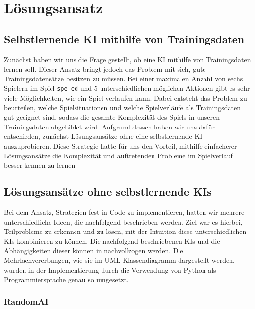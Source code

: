 \chapter{Lösungsansatz}
\label{ch:loesungsansatz}

\section{Selbstlernende KI mithilfe von Trainingsdaten}
\label{sec:selbstlernende-ki-trainingsdaten}

Zunächst haben wir uns die Frage gestellt, ob eine \ac{KI} mithilfe von Trainingsdaten lernen soll.
Dieser Ansatz bringt jedoch das Problem mit sich, gute Trainingsdatensätze besitzen zu müssen.
Bei einer maximalen Anzahl von sechs Spielern im Spiel \texttt{spe\_ed} und 5 unterschiedlichen möglichen Aktionen gibt
es sehr viele Möglichkeiten, wie ein Spiel verlaufen kann.
Dabei entsteht das Problem zu beurteilen, welche Spielsituationen und welche Spielverläufe als Trainingsdaten gut
geeignet sind, sodass die gesamte Komplexität des Spiels in unseren Trainingsdaten abgebildet wird.
Aufgrund dessen haben wir uns dafür entschieden, zunächst Lösungsansätze ohne eine selbstlernende \ac{KI}
auszuprobieren.
Diese Strategie hatte für uns den Vorteil, mithilfe einfacherer Lösungsansätze die Komplexität und auftretenden Probleme
im Spielverlauf besser kennen zu lernen. 

\section{Lösungsansätze ohne selbstlernende KIs}
\label{sec:loesungsansatz-ohne-selbstlernende-kis}

Bei dem Ansatz, Strategien fest in Code zu implementieren, hatten wir mehrere unterschiedliche Ideen,
die nachfolgend beschrieben werden.
Ziel war es hierbei, Teilprobleme zu erkennen und zu lösen, mit der Intuition diese unterschiedlichen \ac{KI}s
kombinieren zu können.
Die nachfolgend beschriebenen \ac{KI}s und die Abhängigkeiten dieser können in 
nachvollzogen werden.
Die Mehrfachvererbungen, wie sie im UML-Klassendiagramm dargestellt werden, wurden in der Implementierung durch die
Verwendung von Python als Programmiersprache genau so umgesetzt.

\subsection{RandomAI}
\label{subsec:random-ai}

